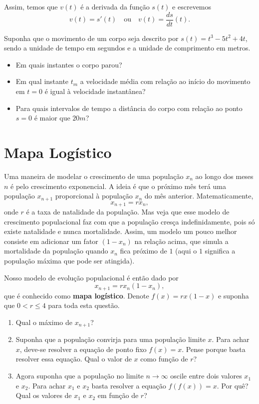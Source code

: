 \documentclass[a4paper,fleqn,12pt]{article}
\begin{document}
Assim, temos que $v(t)$ é a derivada da função $s(t)$ e escrevemos
$$
v(t) = s'(t) \quad \text{ou} \quad v(t) = \frac{ds}{dt}(t).
$$

Suponha que o movimento de um corpo seja descrito por $s(t) = t^3 - 5 t^2 + 4t$, sendo a unidade de tempo em segundos e a unidade de comprimento em metros.

\begin{itemize}
\item Em quais instantes o corpo parou?
\item Em qual instante $t_m$ a velocidade média com relação ao início do movimento em $t = 0$ é igual à velocidade instantânea?
\item Para quais intervalos de tempo a distância do corpo com relação ao ponto $s = 0$ é maior que $20 \unit{m}$?
\end{itemize}


\pagebreak



\pagebreak

\section{Mapa Logístico}

Uma maneira de modelar o crescimento de uma população $x_n$ ao longo dos meses $n$ é pelo crescimento exponencial. A ideia é que o próximo mês terá uma população $x_{n+1}$ proporcional à população $x_n$ do mês anterior. Matematicamente,
$$
x_{n+1} = r x_n,
$$
onde $r$ é a taxa de natalidade da população. Mas veja que esse modelo de crescimento populacional faz com que a população cresça indefinidamente, pois só existe natalidade e nunca mortalidade. Assim, um modelo um pouco melhor consiste em adicionar um fator $(1 - x_n)$ na relação acima, que simula a mortalidade da população quando $x_n$ fica próximo de $1$ (aqui o $1$ significa a população máxima que pode ser atingida).

Nosso modelo de evolução populacional é então dado por
$$
x_{n+1} = r x_n (1 - x_n),
$$
que é conhecido como \textbf{mapa logístico}. Denote $f(x) = r x ( 1 - x )$ e suponha que $0 < r \leq 4$ para toda esta questão.

\n

\begin{enumerate}
\item Qual o máximo de $x_{n+1}$?
\item Suponha que a população convirja para uma população limite $x$. Para achar $x$, deve-se resolver a equação de ponto fixo $f(x) = x$. Pense porque basta resolver essa equação. Qual o valor de $x$ como função de $r$?
\item Agora suponha que a população no limite $n \to \infty$ oscile entre dois valores $x_1$ e $x_2$. Para achar $x_1$ e $x_2$ basta resolver a equação $f(f(x)) = x$. Por quê? Qual os valores de $x_1$ e $x_2$ em função de $r$?
\end{enumerate}
\end{document}

